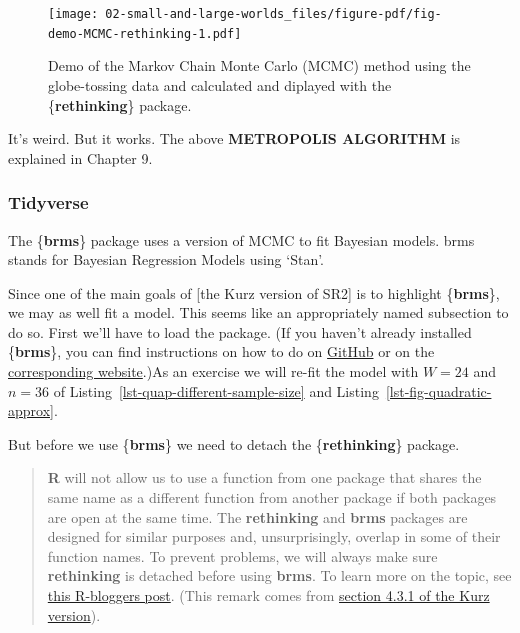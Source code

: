 \documentclass[
  letterpaper,
  DIV=11,
  numbers=noendperiod]{scrreprt}
\begin{document}
\begin{figure}[H]

{\centering \texttt{[image: 02-small-and-large-worlds\_files/figure-pdf/fig-demo-MCMC-rethinking-1.pdf]}

}

\caption{\label{fig-demo-MCMC-rethinking}Demo of the Markov Chain Monte
Carlo (MCMC) method using the globe-tossing data and calculated and
diplayed with the \{\textbf{rethinking}\} package.}

\end{figure}

It's weird. But it works. The above \textbf{METROPOLIS ALGORITHM} is
explained in Chapter 9.

\hypertarget{tidyverse-8}{%
\subsubsection{Tidyverse}\label{tidyverse-8}}

The \{\textbf{brms}\} package uses a version of MCMC to fit Bayesian
models. brms stands for Bayesian Regression Models using `Stan'.

Since one of the main goals of {[}the Kurz version of SR2{]} is to
highlight \{\textbf{brms}\}, we may as well fit a model. This seems like
an appropriately named subsection to do so. First we'll have to load the
package. (If you haven't already installed \{\textbf{brms}\}, you can
find instructions on how to do on
\href{https://github.com/paul-buerkner/brms\#how-do-i-install-brms}{GitHub}
or on the \href{https://paul-buerkner.github.io/brms/}{corresponding
website}.)As an exercise we will re-fit the model with \(W = 24\) and
\(n = 36\) of Listing~\ref{lst-quap-different-sample-size} and
Listing~\ref{lst-fig-quadratic-approx}.

But before we use \{\textbf{brms}\} we need to detach the
\{\textbf{rethinking}\} package.

\begin{quote}
\textbf{R} will not allow us to use a function from one package that
shares the same name as a different function from another package if
both packages are open at the same time. The \textbf{rethinking} and
\textbf{brms} packages are designed for similar purposes and,
unsurprisingly, overlap in some of their function names. To prevent
problems, we will always make sure \textbf{rethinking} is detached
before using \textbf{brms}. To learn more on the topic, see
\href{https://www.r-bloggers.com/2015/04/r-and-package-masking-a-real-life-example/}{this
R-bloggers post}. (This remark comes from
\href{https://bookdown.org/content/4857/geocentric-models.html\#the-data}{section
4.3.1 of the Kurz version}).
\end{quote}
\end{document}
